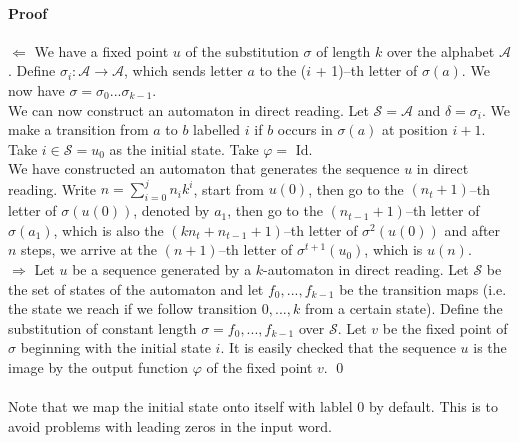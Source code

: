 \documentclass{article}
\begin{document}
\paragraph{Proof}
$\Leftarrow$ We have a fixed point $u$ of the substitution $\sigma$ of length
$k$ over the alphabet $\mathcal{A}$. Define
$\sigma_i: \mathcal{A} \rightarrow \mathcal{A}$, which sends letter $a$ to the
($i$ + 1)--th letter of $\sigma(a)$. We now have
$\sigma = \sigma_0 ... \sigma_{k - 1}$.\\
We can now construct an automaton in direct reading. Let $\mathcal{S = A}$ and
$\delta = \sigma_i$. We make a transition from $a$ to $b$ labelled $i$ if $b$
occurs in $\sigma(a)$ at position $i + 1$. Take $i \in \mathcal{S} = u_0$ as
the initial state. Take $\varphi =$ Id.\\
We have constructed an automaton that generates the sequence $u$ in direct
reading. Write $n = \sum_{i = 0}^j n_i k^i$, start from $u(0)$, then go to the
$(n_t + 1)$--th letter of $\sigma(u(0))$, denoted by $a_1$, then go to the
$(n_{t - 1} + 1)$--th letter of $\sigma(a_1)$, which is also the
$(kn_t + n_{t - 1} + 1)$--th letter of $\sigma^2(u(0))$ and after $n$ steps, we
arrive at the $(n + 1)$--th letter of $\sigma^{t + 1}(u_0)$, which is $u(n)$.\\
$\Rightarrow$ Let $u$ be a sequence generated by a $k$-automaton in direct
reading. Let $\mathcal{S}$ be the set of states of the automaton and let
$f_0, ..., f_{k - 1}$ be the transition maps (i.e. the state we reach if we
follow transition $0, ..., k$ from a certain state). Define the substitution of
constant length $\sigma = f_0, ..., f_{k - 1}$ over $\mathcal{S}$. Let $v$ be
the fixed point of $\sigma$ beginning with the initial state $i$. It is easily
checked that the sequence $u$ is the image by the output function $\varphi$ of
the fixed point $v$. \qed\\
\\
Note that we map the initial state onto itself with lablel 0 by default. This
is to avoid problems with leading zeros in the input word.
\end{document}
